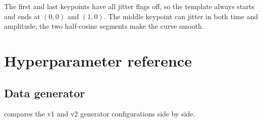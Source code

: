 The first and last keypoints have all jitter flags off, so the
template always starts and ends at $(0,0)$ and $(1,0)$. The middle
keypoint can jitter in both time and amplitude; the two half-cosine
segments make the curve smooth.

\section{Hyperparameter reference}
\label{app:hp}

\subsection{Data generator}
\label{app:hp-gen}

 compares the v1 and v2 generator
configurations side by side.

